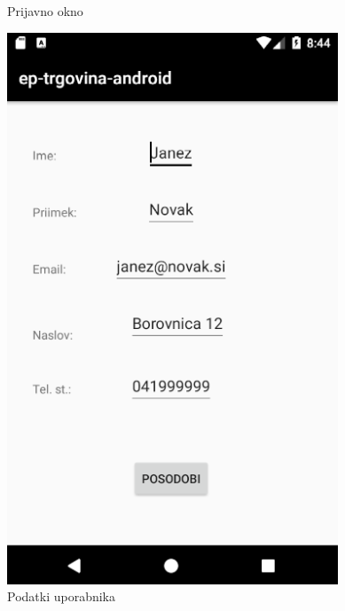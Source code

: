 \documentclass[a4paper,12pt]{report}
\begin{document}
\begin{figure}[h]
    \caption{Prijavno okno}
    \label{fig:login_activity}
\endminipage\hfill
\end{figure}

\begin{figure}[h]
    \centering
  \includegraphics[scale=0.5]{slike/android/UserDataActivity.png}
    \caption{Podatki uporabnika}
    \label{fig:user_detail_activity}
\endminipage\hfill
{}
    \centering

\end{figure}
\end{document}
